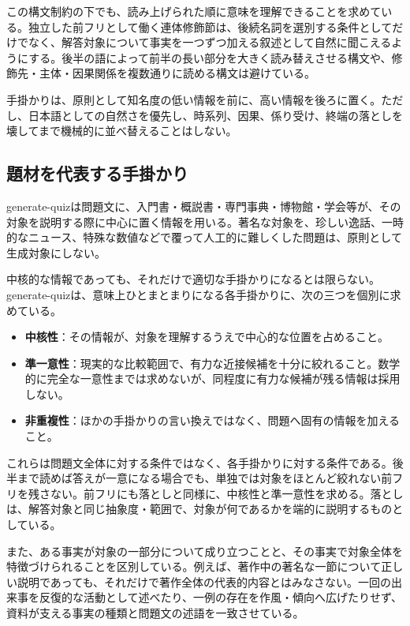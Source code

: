 この構文制約の下でも、読み上げられた順に意味を理解できることを求めている。独立した前フリとして働く連体修飾節は、後続名詞を選別する条件としてだけでなく、解答対象について事実を一つずつ加える叙述として自然に聞こえるようにする。後半の語によって前半の長い部分を大きく読み替えさせる構文や、修飾先・主体・因果関係を複数通りに読める構文は避けている。

手掛かりは、原則として知名度の低い情報を前に、高い情報を後ろに置く。ただし、日本語としての自然さを優先し、時系列、因果、係り受け、終端の落としを壊してまで機械的に並べ替えることはしない。

\subsection*{題材を代表する手掛かり}

generate-quizは問題文に、入門書・概説書・専門事典・博物館・学会等が、その対象を説明する際に中心に置く情報を用いる。著名な対象を、珍しい逸話、一時的なニュース、特殊な数値などで覆って人工的に難しくした問題は、原則として生成対象にしない。

中核的な情報であっても、それだけで適切な手掛かりになるとは限らない。generate-quizは、意味上ひとまとまりになる各手掛かりに、次の三つを個別に求めている。

\begin{itemize}
  \item \textbf{中核性}：その情報が、対象を理解するうえで中心的な位置を占めること。
  \item \textbf{準一意性}：現実的な比較範囲で、有力な近接候補を十分に絞れること。数学的に完全な一意性までは求めないが、同程度に有力な候補が残る情報は採用しない。
  \item \textbf{非重複性}：ほかの手掛かりの言い換えではなく、問題へ固有の情報を加えること。
\end{itemize}

これらは問題文全体に対する条件ではなく、各手掛かりに対する条件である。後半まで読めば答えが一意になる場合でも、単独では対象をほとんど絞れない前フリを残さない。前フリにも落としと同様に、中核性と準一意性を求める。落としは、解答対象と同じ抽象度・範囲で、対象が何であるかを端的に説明するものとしている。

また、ある事実が対象の一部分について成り立つことと、その事実で対象全体を特徴づけられることを区別している。例えば、著作中の著名な一節について正しい説明であっても、それだけで著作全体の代表的内容とはみなさない。一回の出来事を反復的な活動として述べたり、一例の存在を作風・傾向へ広げたりせず、資料が支える事実の種類と問題文の述語を一致させている。

